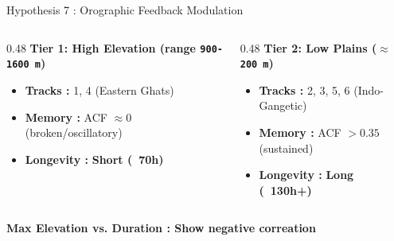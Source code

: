 \documentclass[8pt, aspectratio=169]{beamer}
\begin{document}
\begin{frame}{Hypothesis 7 : Orographic Feedback Modulation}
    \vspace{0.15cm}
    \footnotesize
    \begin{center}
        \begin{columns}[T]
            \begin{column}{0.48\textwidth}
                \textbf{Tier 1: High Elevation (range \texttt{900-1600 m})}
                \begin{itemize}
                    \item \textbf{Tracks :} 1, 4 (Eastern Ghats)
                    \item \textbf{Memory :} ACF $\approx 0$ (broken/oscillatory)
                    \item \textbf{Longevity :} \textbf{Short (~70h)}
                \end{itemize}
            \end{column}
            \begin{column}{0.48\textwidth}
                \textbf{Tier 2: Low Plains (\texttt{$\approx$200 m})}
                \begin{itemize}
                    \item \textbf{Tracks :} 2, 3, 5, 6 (Indo-Gangetic)
                    \item \textbf{Memory :} ACF $> 0.35$ (sustained)
                    \item \textbf{Longevity :} \textbf{Long (~130h+)}
                \end{itemize}
            \end{column}
        \end{columns}
    \end{center}

    \vspace{0.3cm}
    \centering
    \textbf{Max Elevation vs. Duration : Show negative correation} \\
\end{frame}
\end{document}
